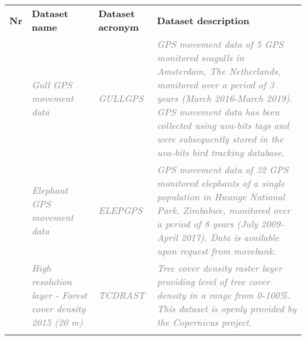 \documentclass[12pt]{article}
\begin{document}

\begin{table}[H]
 			\centering
\begin{tabular}{p{0.20in}p{}p{0.80in}p{3.70in}}
\hline
\multicolumn{1}{|p{0.20in}}{\textbf{Nr}} & 
\multicolumn{1}{|p{0.80in}}{\textbf{Dataset name}} & 
\multicolumn{1}{|p{0.80in}|}{\textbf{Dataset acronym}} &
\multicolumn{1}{|p{3.70in}|}{\textbf{Dataset description}} \\
\hhline{----}
\multicolumn{1}{|p{0.20in}}{\textit{\textcolor[HTML]{808080}{D1}}} & %
\multicolumn{1}{|p{0.80in}}{\textit{\textcolor[HTML]{808080}{Gull GPS movement data}}} & %
\multicolumn{1}{|p{0.80in}|}{\textit{\textcolor[HTML]{808080}{GULLGPS}}} & %
\multicolumn{1}{|p{3.70in}|}{\textit{\textcolor[HTML]{808080}{GPS movement data of 5 GPS monitored seagulls in Amsterdam, The Netherlands, monitored over a period of 3 years (March 2016-March 2019). GPS movement data has been collected using uva-bits tags and were subsequently stored in the uva-bits bird tracking database.}}} \\ %
\hhline{----}
\multicolumn{1}{|p{0.20in}}{\textit{\textcolor[HTML]{808080}{D2}}} & %
\multicolumn{1}{|p{0.80in}}{\textit{\textcolor[HTML]{808080}{Elephant GPS movement data}}} & %
\multicolumn{1}{|p{0.80in}|}{\textit{\textcolor[HTML]{808080}{ELEPGPS}}} & %
\multicolumn{1}{|p{3.70in}|}{\textit{\textcolor[HTML]{808080}{GPS movement data of 32 GPS monitored elephants of a single population in Hwange National Park, Zimbabwe, monitored over a period of 8 years (July 2009-April 2017). Data is available upon request from movebank.}}} \\ %
\hhline{----}
\multicolumn{1}{|p{0.20in}}{\textit{\textcolor[HTML]{808080}{D3}}} & %
\multicolumn{1}{|p{0.80in}}{\textit{\textcolor[HTML]{808080}{High resolution layer - Forest cover density 2015 (20 m)}}} & %
\multicolumn{1}{|p{0.80in}|}{\textit{\textcolor[HTML]{808080}{TCDRAST}}} & %
\multicolumn{1}{|p{3.70in}|}{\textit{\textcolor[HTML]{808080}{Tree cover density raster layer providing level of tree cover density in a range from 0-100\%. This dataset is openly provided by the Copernicus project.}}} \\ %
\hhline{----}
\multicolumn{1}{|p{0.20in}}{\textit{\textcolor[HTML]{808080}{D4}}} & %

\end{tabular}
\end{table}
\end{document}
